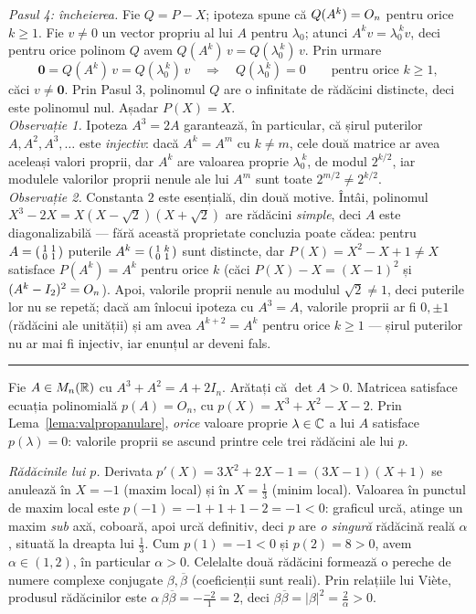\emph{Pasul 4: încheierea.} Fie $Q=P-X$; ipoteza spune că $Q(A^k)=O_n$ pentru orice $k\ge1$. Fie $v\neq0$ un vector propriu al lui $A$ pentru $\lambda_0$; atunci $A^kv=\lambda_0^{\,k}v$, deci pentru orice polinom $Q$ avem $Q(A^k)\,v=Q(\lambda_0^{\,k})\,v$. Prin urmare
\[ \mathbf{0}=Q(A^k)\,v=Q(\lambda_0^{\,k})\,v\quad\Longrightarrow\quad Q(\lambda_0^{\,k})=0\qquad\text{pentru orice }k\ge1 , \]
căci $v\neq\mathbf 0$. Prin Pasul 3, polinomul $Q$ are o infinitate de rădăcini distincte, deci este polinomul nul. Așadar $P(X)=X$.\\[2pt]
\emph{Observație 1.} Ipoteza $A^3=2A$ garantează, în particular, că șirul puterilor $A,A^2,A^3,\dots$ este \emph{injectiv}: dacă $A^k=A^m$ cu $k\neq m$, cele două matrice ar avea aceleași valori proprii, dar $A^k$ are valoarea proprie $\lambda_0^{\,k}$, de modul $2^{k/2}$, iar modulele valorilor proprii nenule ale lui $A^m$ sunt toate $2^{m/2}\neq2^{k/2}$.\\[2pt]
\emph{Observație 2.} Constanta $2$ este esențială, din două motive. Întâi, polinomul $X^3-2X=X(X-\sqrt2)(X+\sqrt2)$ are rădăcini \emph{simple}, deci $A$ este diagonalizabilă --- fără această proprietate concluzia poate cădea: pentru $A=\begin{psmallmatrix}1&1\\0&1\end{psmallmatrix}$ puterile $A^k=\begin{psmallmatrix}1&k\\0&1\end{psmallmatrix}$ sunt distincte, dar $P(X)=X^2-X+1\neq X$ satisface $P(A^k)=A^k$ pentru orice $k$ (căci $P(X)-X=(X-1)^2$ și $(A^k-I_2)^2=O_n$). Apoi, valorile proprii nenule au modulul $\sqrt2\neq1$, deci puterile lor nu se repetă; dacă am înlocui ipoteza cu $A^3=A$, valorile proprii ar fi $0,\pm1$ (rădăcini ale unității) și am avea $A^{k+2}=A^k$ pentru orice $k\ge1$ --- șirul puterilor nu ar mai fi injectiv, iar enunțul ar deveni fals.
\vspace{1mm}\hrule

Fie $A \in M_n(\mathbb{R})$ cu $A^3 + A^2 = A + 2I_n$. Arătați că $\det A > 0$.
\sol Matricea satisface ecuația polinomială $p(A) = O_n$, cu $p(X) = X^3 + X^2 - X - 2$. Prin Lema~\ref{lema:valpropanulare}, \emph{orice} valoare proprie $\lambda \in \mathbb{C}$ a lui $A$ satisface $p(\lambda) = 0$: valorile proprii se ascund printre cele trei rădăcini ale lui $p$.

\emph{Rădăcinile lui $p$.} Derivata $p'(X) = 3X^2 + 2X - 1 = (3X-1)(X+1)$ se anulează în $X = -1$ (maxim local) și în $X = \frac{1}{3}$ (minim local). Valoarea în punctul de maxim local este $p(-1) = -1 + 1 + 1 - 2 = -1 < 0$: graficul urcă, atinge un maxim \emph{sub} axă, coboară, apoi urcă definitiv, deci $p$ are \emph{o singură} rădăcină reală $\alpha$, situată la dreapta lui $\frac{1}{3}$. Cum $p(1) = -1 < 0$ și $p(2) = 8 > 0$, avem $\alpha \in (1,2)$, în particular $\alpha > 0$. Celelalte două rădăcini formează o pereche de numere complexe conjugate $\beta, \overline{\beta}$ (coeficienții sunt reali). Prin relațiile lui Viète, produsul rădăcinilor este $\alpha\,\beta\overline{\beta} = -\frac{-2}{1} = 2$, deci $\beta\overline{\beta} = |\beta|^2 = \frac{2}{\alpha} > 0$.

